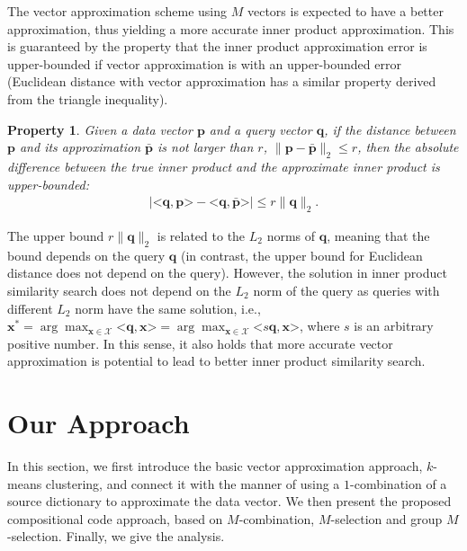 \documentclass[10pt, letterpaper]{article}
\newtheorem{Property}{Property}
\begin{document}
The vector approximation scheme using $M$ vectors
is expected to have a better approximation,
thus yielding a more accurate inner product approximation.
This is guaranteed by
the property
that the inner product approximation error
is upper-bounded
if vector approximation is
with an upper-bounded error
(Euclidean distance with vector approximation
has a similar property derived
from the triangle inequality).
\begin{Property}
\label{property:innerproductbound}
Given a data vector $\mathbf{p}$
and a query vector $\mathbf{q}$,
if the distance between $\mathbf{p}$
and its approximation $\bar{\mathbf{p}}$
is not larger than $r$,
$\|\mathbf{p} - \bar{\mathbf{p}}\|_2 \leqslant r$,
then the absolute difference between
the true inner product
and the approximate inner product
is upper-bounded:
\begin{align}
|\texttt{<} \mathbf{q}, \mathbf{p} \texttt{>} - \texttt{<} \mathbf{q}, \bar{\mathbf{p}} \texttt{>}|
\leqslant r \|\mathbf{q}\|_2.
\end{align}
\end{Property}


The upper bound $r\| \mathbf{q} \|_2$
is related to the $L_2$ norms of $\mathbf{q}$,
meaning that the bound depends on the query $\mathbf{q}$
(in contrast,
the upper bound for Euclidean distance does not depend on the query).
However,
the solution in inner product similarity search
does not depend on the $L_2$ norm of the query
as queries with different $L_2$ norm have the same solution,
i.e.,
$\mathbf{x}^* = \arg\max_{\mathbf{x} \in \mathcal{X}} \texttt{<} \mathbf{q}, \mathbf{x}\texttt{>}
= \arg\max_{\mathbf{x} \in \mathcal{X}} \texttt{<} s\mathbf{q}, \mathbf{x}\texttt{>}$,
where $s$ is an arbitrary positive number.
In this sense, it also holds
that
more accurate vector approximation is potential to
lead to better inner product similarity search.







\section{Our Approach}
In this section,
we first introduce the basic vector approximation approach,
$k$-means clustering,
and connect it with the manner of
using a $1$-combination of a source dictionary
to approximate the data vector.
We then present the proposed compositional code approach,
based on $M$-combination, $M$-selection and group $M$-selection.
Finally,
we give the analysis.
\end{document}
